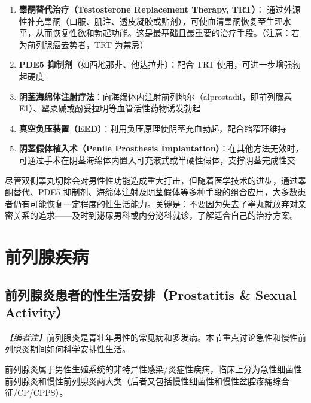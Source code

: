 \begin{enumerate}
\begin{enumerate}
	\item \textbf{睾酮替代治疗（Testosterone Replacement Therapy, TRT）}：
	通过外源性补充睾酮（口服、肌注、透皮凝胶或贴剂），可使血清睾酮恢复至生理水平，从而恢复性欲和勃起功能。这是最基础且最重要的治疗手段。（注意：若为前列腺癌去势者，TRT 为禁忌）

	\item \textbf{PDE5 抑制剂}（如西地那非、他达拉非）：配合 TRT 使用，可进一步增强勃起硬度

	\item \textbf{阴茎海绵体注射疗法}：向海绵体内注射前列地尔（alprostadil，即前列腺素 E1）、罂粟碱或酚妥拉明等血管活性药物诱发勃起

	\item \textbf{真空负压装置（EED）}：利用负压原理使阴茎充血勃起，配合缩窄环维持

	\item \textbf{阴茎假体植入术（Penile Prosthesis Implantation）}：在其他方法无效时，可通过手术在阴茎海绵体内置入可充液式或半硬性假体，支撑阴茎完成性交
\end{enumerate}

\begin{tcolorbox}[colback=pink!5!white,colframe=red!50!black,title=贴心小叮咛]
尽管双侧睾丸切除会对男性性功能造成重大打击，但随着医学技术的进步，通过睾酮替代、PDE5 抑制剂、海绵体注射及阴茎假体等多种手段的组合应用，大多数患者仍有可能恢复一定程度的性生活能力。关键是：不要因为失去了睾丸就放弃对亲密关系的追求——及时到泌尿男科或内分泌科就诊，了解适合自己的治疗方案。
\end{tcolorbox}

\section{前列腺疾病}

\subsection{前列腺炎患者的性生活安排（Prostatitis \& Sexual Activity）}

\noindent\textit{【编者注】}前列腺炎是青壮年男性的常见病和多发病。本节重点讨论急性和慢性前列腺炎期间如何科学安排性生活。

\vspace{0.5em}
前列腺炎属于男性生殖系统的非特异性感染/炎症性疾病，临床上分为急性细菌性前列腺炎和慢性前列腺炎两大类（后者又包括慢性细菌性和慢性盆腔疼痛综合征/CP/CPPS）。


\end{enumerate}
